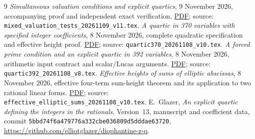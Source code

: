 \documentclass[11pt,a4paper]{article}
\theoremstyle{remark}\newtheorem{remark}[theorem]{Remark}
\begin{document}
\begin{thebibliography}{9}
\emph{Simultaneous valuation conditions and explicit quartics},
9 November 2026, accompanying proof and independent exact verification.
\href{../local_tests/mixed_valuation_tests_20261109_v11.pdf}{PDF}; source: \nolinkurl{mixed_valuation_tests_20261109_v11.tex}.
\emph{A quartic in 370 variables with specified integer coefficients},
8 November 2026, complete quadratic specification and effective height proof.
\href{quartic370_20261108_v10.pdf}{PDF}; source: \nolinkurl{quartic370_20261108_v10.tex}.
\emph{A forced prime condition and an explicit quartic in 392 variables},
8 November 2026, arithmetic input contract and scalar/Lucas arguments.
\href{quartic392_20261108_v8.pdf}{PDF}; source: \nolinkurl{quartic392_20261108_v8.tex}.
\emph{Effective heights of sums of elliptic abscissas}, 8 November 2026,
effective four-term sum-height theorem and its application to two rational
linear forms.
\href{../effective_sums/effective_elliptic_sums_20261108_v10.pdf}{PDF}; source: \nolinkurl{effective_elliptic_sums_20261108_v10.tex}.
E.~Glazer, \emph{An explicit quartic defining the integers in the rationals},
Version~13, manuscript and coefficient data, commit
\nolinkurl{5bbd74f6a479776a332cbe036809d5dddae63720},
\url{https://github.com/elliotglazer/diophantine-z-q}.
\end{thebibliography}
\end{document}
